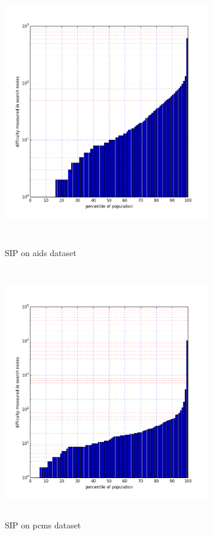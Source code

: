 \documentclass{l4proj}
\begin{document}
\begin{figure}
\centering
\begin{minipage}[t]{.5\textwidth}
  \centering
  \includegraphics[height=11cm,width=9cm]{images/plots/aidsPercentileLog.png}
  \caption{SIP on aids dataset}
  \label{aidsNodes}
\end{minipage}%
\begin{minipage}[t]{.5\textwidth}
  \centering
  \includegraphics[height=11cm,width=9cm]{images/plots/pcmsPercentileLog.png}
  \caption{SIP on pcms dataset}
  \label{pcmsNodes}
\end{minipage}
\end{figure}
\end{document}

